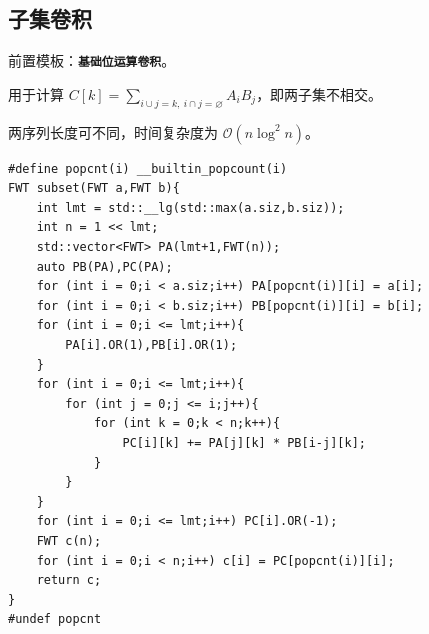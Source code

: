 \subsection{子集卷积}

前置模板：\textbf{\texttt{基础位运算卷积}}。

用于计算 $C[k]=\sum_{i\cup j=k,\ i\cap j=\varnothing}A_iB_j$，即两子集不相交。

两序列长度可不同，时间复杂度为 $\mathcal{O}(n\log^2n)$。

\begin{lstlisting}
#define popcnt(i) __builtin_popcount(i)
FWT subset(FWT a,FWT b){
    int lmt = std::__lg(std::max(a.siz,b.siz));
    int n = 1 << lmt;
    std::vector<FWT> PA(lmt+1,FWT(n));
    auto PB(PA),PC(PA);
    for (int i = 0;i < a.siz;i++) PA[popcnt(i)][i] = a[i];
    for (int i = 0;i < b.siz;i++) PB[popcnt(i)][i] = b[i];
    for (int i = 0;i <= lmt;i++){
        PA[i].OR(1),PB[i].OR(1);
    }
    for (int i = 0;i <= lmt;i++){
        for (int j = 0;j <= i;j++){
            for (int k = 0;k < n;k++){
                PC[i][k] += PA[j][k] * PB[i-j][k];
            }
        }
    }
    for (int i = 0;i <= lmt;i++) PC[i].OR(-1);
    FWT c(n);
    for (int i = 0;i < n;i++) c[i] = PC[popcnt(i)][i];
    return c;
}
#undef popcnt
\end{lstlisting}
